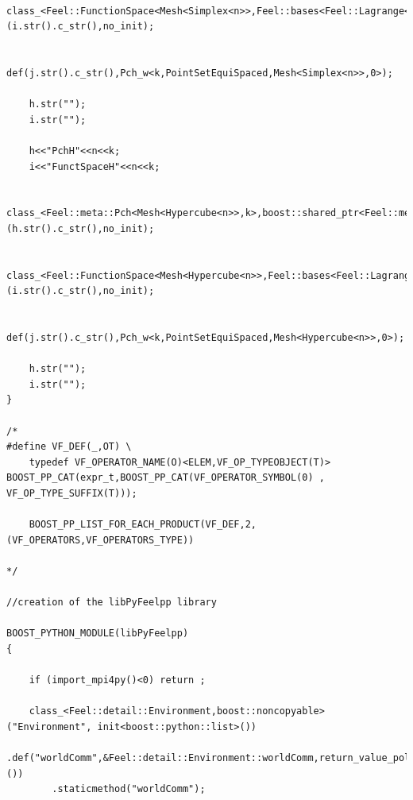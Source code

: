 \documentclass[french,12pt]{article}
\begin{document}
\begin{lstlisting}
    class_<Feel::FunctionSpace<Mesh<Simplex<n>>,Feel::bases<Feel::Lagrange<k,Feel::Scalar,Feel::Continuous,Feel::PointSetEquiSpaced,0>>,double,Feel::Periodicity<Feel::NoPeriodicity>,Feel::mortars<Feel::NoMortar>>,boost::shared_ptr<Feel::FunctionSpace<Mesh<Simplex<n>>,Feel::bases<Feel::Lagrange<k,Feel::Scalar,Feel::Continuous,Feel::PointSetEquiSpaced,0>>,double,Feel::Periodicity<Feel::NoPeriodicity>,Feel::mortars<Feel::NoMortar>>>,boost::python::bases<Feel::FunctionSpaceBase>>(i.str().c_str(),no_init);

    def(j.str().c_str(),Pch_w<k,PointSetEquiSpaced,Mesh<Simplex<n>>,0>);

    h.str("");
    i.str(""); 

    h<<"PchH"<<n<<k;
    i<<"FunctSpaceH"<<n<<k;

    class_<Feel::meta::Pch<Mesh<Hypercube<n>>,k>,boost::shared_ptr<Feel::meta::Pch<Mesh<Hypercube<n>>,k>>>(h.str().c_str(),no_init);

    class_<Feel::FunctionSpace<Mesh<Hypercube<n>>,Feel::bases<Feel::Lagrange<k,Feel::Scalar,Feel::Continuous,Feel::PointSetEquiSpaced,0>>,double,Feel::Periodicity<Feel::NoPeriodicity>,Feel::mortars<Feel::NoMortar>>,boost::shared_ptr<Feel::FunctionSpace<Mesh<Hypercube<n>>,Feel::bases<Feel::Lagrange<k,Feel::Scalar,Feel::Continuous,Feel::PointSetEquiSpaced,0>>,double,Feel::Periodicity<Feel::NoPeriodicity>,Feel::mortars<Feel::NoMortar>>>,boost::python::bases<Feel::FunctionSpaceBase>>(i.str().c_str(),no_init);

    def(j.str().c_str(),Pch_w<k,PointSetEquiSpaced,Mesh<Hypercube<n>>,0>);

    h.str("");
    i.str(""); 
}

/*
#define VF_DEF(_,OT) \
    typedef VF_OPERATOR_NAME(O)<ELEM,VF_OP_TYPEOBJECT(T)> BOOST_PP_CAT(expr_t,BOOST_PP_CAT(VF_OPERATOR_SYMBOL(0) , VF_OP_TYPE_SUFFIX(T)));

    BOOST_PP_LIST_FOR_EACH_PRODUCT(VF_DEF,2,(VF_OPERATORS,VF_OPERATORS_TYPE))

*/

//creation of the libPyFeelpp library 

BOOST_PYTHON_MODULE(libPyFeelpp)
{

    if (import_mpi4py()<0) return ;

    class_<Feel::detail::Environment,boost::noncopyable>("Environment", init<boost::python::list>()) 
        .def("worldComm",&Feel::detail::Environment::worldComm,return_value_policy<copy_non_const_reference>())
        .staticmethod("worldComm");


\end{lstlisting}
\end{document}
